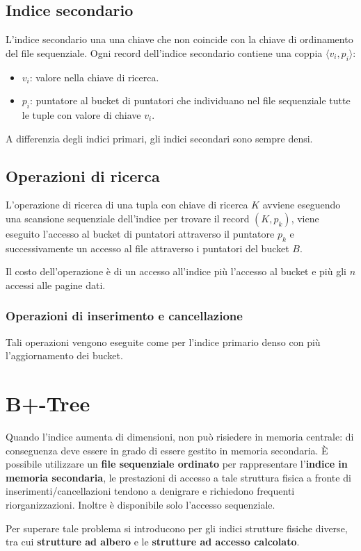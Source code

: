 \documentclass[oneside,a4paper,11pt]{book}
\theoremstyle{italicstyle}
\theoremstyle{normStyle}
\begin{document}
\subsection{Indice secondario}
L'indice secondario una una chiave che non coincide con la chiave di ordinamento del file 
sequenziale. Ogni record dell'indice secondario contiene una coppia $\langle v_i,p_i\rangle$:
\begin{itemize}
    \item $v_i$: valore nella chiave di ricerca.
    \item $p_i$: puntatore al bucket di puntatori che individuano nel file 
    sequenziale tutte le tuple con valore di chiave $v_i$.
\end{itemize}
A differenzia degli indici primari, gli indici secondari sono sempre densi.
\subsection{Operazioni di ricerca}
L'operazione di ricerca di una tupla con chiave di ricerca $K$ avviene eseguendo 
una scansione sequenziale dell'indice per trovare il record $(K,p_k)$, viene eseguito 
l'accesso al bucket di puntatori attraverso il puntatore $p_k$ e successivamente un accesso al file 
attraverso i puntatori del bucket $B$.

Il costo dell'operazione è di un accesso all'indice più l'accesso al bucket e più 
gli $n$ accessi alle pagine dati.
\subsubsection{Operazioni di inserimento e cancellazione}
Tali operazioni vengono eseguite come per l'indice primario denso con più 
l'aggiornamento dei bucket.
\section{B+-Tree} 
Quando l'indice aumenta di dimensioni, non può risiedere in memoria centrale: di conseguenza
deve essere in grado di essere gestito in memoria secondaria. È possibile utilizzare 
un \textbf{file sequenziale ordinato} per rappresentare l'\textbf{indice in memoria 
secondaria}, le prestazioni di accesso a tale struttura fisica a fronte di inserimenti/cancellazioni 
tendono a denigrare e richiedono frequenti riorganizzazioni. Inoltre è disponibile solo 
l'accesso sequenziale.

Per superare tale problema si introducono per gli indici strutture fisiche diverse, tra cui 
\textbf{strutture ad albero} e le \textbf{strutture ad accesso calcolato}.
\end{document}
